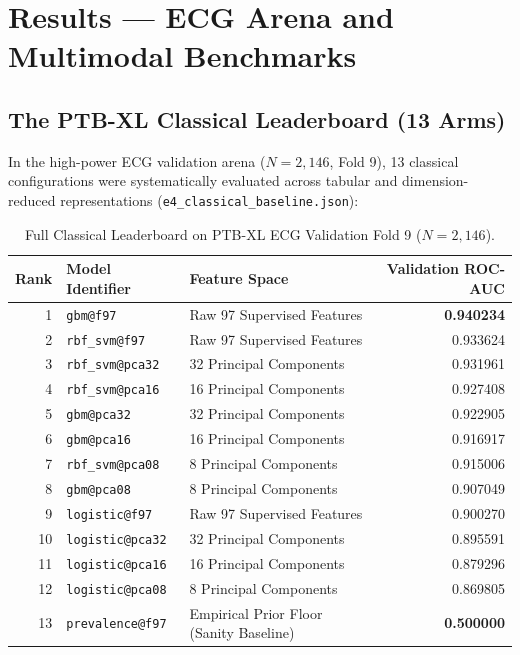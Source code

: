\documentclass[11pt,a4paper]{report}
\newcommand{\artifact}[1]{\texttt{\footnotesize #1}}
\begin{document}
\chapter{Results --- ECG Arena and Multimodal Benchmarks}

\section{The PTB-XL Classical Leaderboard (13 Arms)}
In the high-power ECG validation arena ($N=2,146$, Fold 9), 13 classical configurations were systematically evaluated across tabular and dimension-reduced representations (\artifact{e4\_classical\_baseline.json}):

\begin{table}[H]
\centering
\small
\begin{tabular}{rllr}
\toprule
\textbf{Rank} & \textbf{Model Identifier} & \textbf{Feature Space} & \textbf{Validation ROC-AUC} \\
\midrule
1 & \texttt{gbm@f97} & Raw 97 Supervised Features & \textbf{0.940234} \\
2 & \texttt{rbf\_svm@f97} & Raw 97 Supervised Features & 0.933624 \\
3 & \texttt{rbf\_svm@pca32} & 32 Principal Components & 0.931961 \\
4 & \texttt{rbf\_svm@pca16} & 16 Principal Components & 0.927408 \\
5 & \texttt{gbm@pca32} & 32 Principal Components & 0.922905 \\
6 & \texttt{gbm@pca16} & 16 Principal Components & 0.916917 \\
7 & \texttt{rbf\_svm@pca08} & 8 Principal Components & 0.915006 \\
8 & \texttt{gbm@pca08} & 8 Principal Components & 0.907049 \\
9 & \texttt{logistic@f97} & Raw 97 Supervised Features & 0.900270 \\
10 & \texttt{logistic@pca32} & 32 Principal Components & 0.895591 \\
11 & \texttt{logistic@pca16} & 16 Principal Components & 0.879296 \\
12 & \texttt{logistic@pca08} & 8 Principal Components & 0.869805 \\
13 & \texttt{prevalence@f97} & Empirical Prior Floor (Sanity Baseline) & \textbf{0.500000} \\
\bottomrule
\end{tabular}
\caption{Full Classical Leaderboard on PTB-XL ECG Validation Fold 9 ($N=2,146$).}
\label{tab:ecg_leaderboard}
\end{table}
\end{document}
